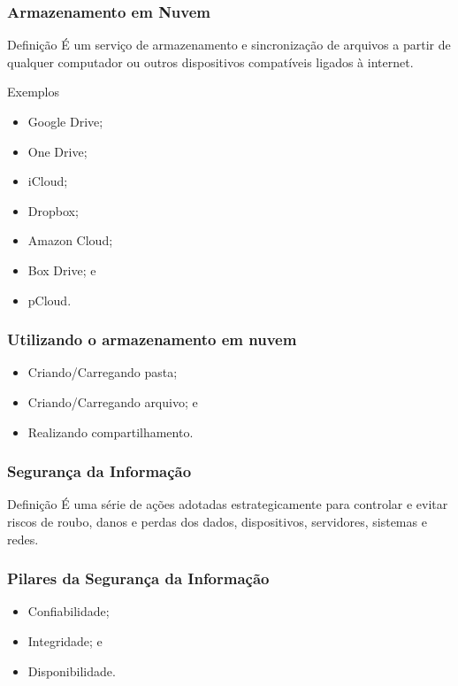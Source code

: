 \documentclass[aspectratio=169]{beamer} %
\begin{document}
\begin{frame}
	\frametitle{Armazenamento em Nuvem}
	
	\begin{block}{Defini\c cão}
		É um serviço de armazenamento e sincronização de arquivos a partir de qualquer computador ou outros dispositivos compatíveis ligados à internet.
	\end{block} \vfill
	
	\begin{exampleblock}{Exemplos}
		\begin{itemize}
			\item Google Drive;
			\item One Drive;
			\item iCloud; 
			\item Dropbox;
			\item Amazon Cloud;
			\item Box Drive; e
			\item pCloud.
		\end{itemize}
	\end{exampleblock}
\end{frame}

\begin{frame}
	\frametitle{Utilizando o armazenamento em nuvem}
	
	\begin{itemize}
		\item Criando/Carregando pasta;
		\item Criando/Carregando arquivo; e
		\item Realizando compartilhamento.
	\end{itemize}
\end{frame}

\begin{frame}
	\frametitle{Segurança da Informação}
	
	\begin{block}{Definição}
		 É uma série de ações adotadas estrategicamente para controlar e evitar riscos de roubo, danos e perdas dos dados, dispositivos, servidores, sistemas e redes.
	\end{block}
\end{frame}

\begin{frame}
	\frametitle{Pilares da Segurança da Informação}

	\begin{itemize}
		\item Confiabilidade;
		\item Integridade; e
		\item Disponibilidade.
	\end{itemize}
\end{frame}
\end{document}
